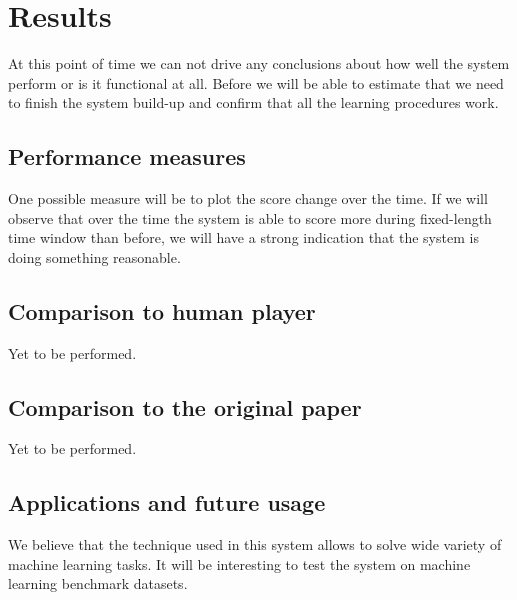 \documentclass[a4paper,12pt]{article}
\begin{document}
%
%
\pagebreak
\section{Results}
At this point of time we can not drive any conclusions about how well the system perform or is it functional at all. Before we will be able to estimate that we need to finish the system build-up and confirm that all the learning procedures work.

\subsection{Performance measures}
One possible measure will be to plot the score change over the time. If we will observe that over the time the system is able to score more during fixed-length time window than before, we will have a strong indication that the system is doing something reasonable.

\subsection{Comparison to human player}
Yet to be performed.

\subsection{Comparison to the original paper}
Yet to be performed.

\subsection{Applications and future usage}
We believe that the technique used in this system allows to solve wide variety of machine learning tasks. It will be interesting to test the system on machine learning benchmark datasets.



%
%
\pagebreak
{}


\end{document}
